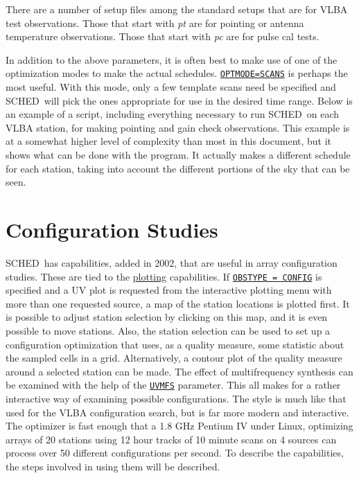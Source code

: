 \documentclass{report}
\newcommand{\schedb}{{\sc SCHED~}}
\begin{document}
There are a number of setup files among the standard setups that are
for VLBA test observations.  Those that start with {\sl pt} are for
pointing or antenna temperature observations.  Those that start with
{\sl pc} are for pulse cal tests.

In addition to the above parameters, it is often best to make use
of one of the optimization modes to make the actual schedules.
{\hyperref[MP:OPTMODE]{{\tt OPTMODE=SCANS}}} is perhaps the most
useful.  With this mode, only a few template scans need be specified
and \schedb will pick the ones appropriate for use in the desired
time range.  Below is an example of a script, including everything
necessary to run \schedb on each VLBA station, for making pointing
and gain check observations.  This example is at a somewhat higher
level of complexity than most in this document, but it shows what
can be done with the program.  It actually makes a different schedule
for each station, taking into account the different portions of
the sky that can be seen.



\section{\label{SEC:CONFIG}Configuration Studies}

\schedb has capabilities, added in 2002, that are useful in array
configuration studies.  These are tied to the
{\hyperref[SEC:PLOT]{plotting}} capabilities.  If 
{\hyperref[MP:OBSTYPE]{{\tt OBSTYPE = CONFIG}}}
is specified and a UV plot is requested from the
interactive plotting menu with more than one requested source, a map
of the station locations is plotted first.  It is possible to adjust
station selection by clicking on this map, and it is even possible to
move stations.  Also, the station selection can be used to set up a
configuration optimization that uses, as a quality measure, some
statistic about the sampled cells in a grid.  Alternatively, a contour
plot of the quality measure around a selected station can be made.
The effect of multifrequency synthesis can be examined with the help
of the 
{\hyperref[MP:UVMFS]{{\tt UVMFS}}} parameter.  This all makes for
a rather interactive way of examining possible configurations.  The
style is much like that used for the VLBA configuration search, but is
far more modern and interactive.  The optimizer is fast enough that a
1.8 GHz Pentium IV under Linux, optimizing arrays of 20 stations using
12 hour tracks of 10 minute scans on 4 sources can process over 50
different configurations per second.  To describe the capabilities,
the steps involved in using them will be described.
\end{document}
